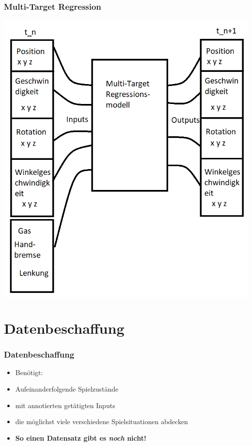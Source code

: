 \documentclass{beamer}
\begin{document}
\begin{frame}
 \frametitle{Multi-Target Regression}
  \includegraphics[height = 0.9\textheight]{MTR.png}
 \end{frame}

 \section{Datenbeschaffung}
\begin{frame}
 \frametitle{Datenbeschaffung}
  \begin{itemize}
   \item Benötigt:
   \item Aufeinanderfolgende Spielzustände
   \item mit annotierten getätigten Inputs
   \item die möglichst viele verschiedene Spielsituationen abdecken
   \item \textbf{So einen Datensatz gibt es \textit{noch} nicht!}
  \end{itemize}
 \end{frame}
\end{document}
